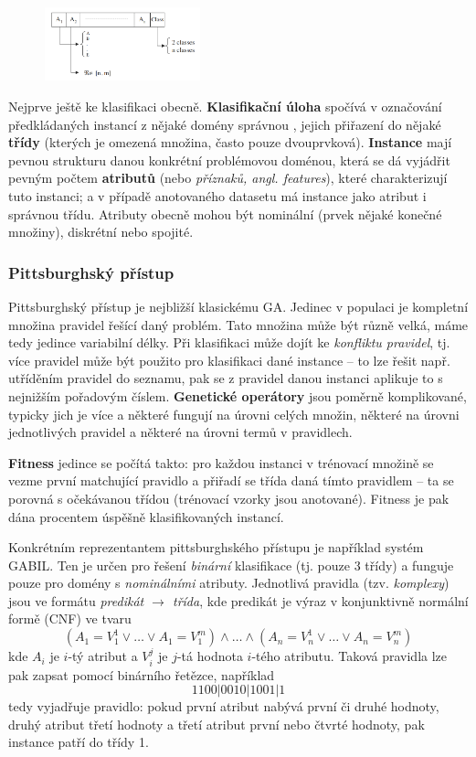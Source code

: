 \begin{figure}
\centering
\includegraphics[width=0.4\textwidth]{img/classification_instance.png}
\end{figure}
Nejprve ještě ke klasifikaci obecně. \textbf{Klasifikační úloha} spočívá v označování předkládaných instancí z nějaké domény správnou , jejich přiřazení do nějaké \textbf{třídy} (kterých je omezená množina, často pouze dvouprvková). \textbf{Instance} mají pevnou strukturu danou konkrétní problémovou doménou, která se dá vyjádřit pevným počtem \textbf{atributů} (nebo \textit{příznaků, angl. features}), které charakterizují tuto instanci; a v případě anotovaného datasetu má instance jako atribut i správnou třídu. Atributy obecně mohou být nominální (prvek nějaké konečné množiny), diskrétní nebo spojité.


\subsubsection{Pittsburghský přístup}
Pittsburghský přístup je nejbližší klasickému GA. Jedinec v populaci je kompletní množina pravidel řešící daný problém. Tato množina může být různě velká, máme tedy jedince variabilní délky. Při klasifikaci může dojít ke \textit{konfliktu pravidel}, tj. více pravidel může být použito pro klasifikaci dané instance -- to lze řešit např. utříděním pravidel do seznamu, pak se z pravidel  danou instanci aplikuje to s nejnižším pořadovým číslem. \textbf{Genetické operátory} jsou poměrně komplikované, typicky jich je více a některé fungují na úrovni celých množin, některé na úrovni jednotlivých pravidel a některé na úrovni termů v pravidlech. 

\textbf{Fitness} jedince se počítá takto: pro každou instanci v trénovací množině se vezme první matchující pravidlo a přiřadí se třída daná tímto pravidlem -- ta se porovná s očekávanou třídou (trénovací vzorky jsou anotované). Fitness je pak dána procentem úspěšně klasifikovaných instancí.

Konkrétním reprezentantem pittsburghského přístupu je například systém GABIL. Ten je určen pro řešení \textit{binární} klasifikace (tj. pouze 3 třídy) a funguje pouze pro domény s \textit{nominálními} atributy. Jednotlivá pravidla (tzv. \textit{komplexy}) jsou ve formátu \textit{predikát $\rightarrow$ třída}, kde predikát je výraz v konjunktivně normální formě (CNF) ve tvaru
$$(A_1 = V_1^1 \lor \dots \lor A_1 = V_1^m) \land \dots \land (A_n = V_n^1 \lor \dots \lor A_n = V_n^m)$$
kde $A_i$ je $i$-tý atribut a $V_i^j$ je $j$-tá hodnota $i$-tého atributu. Taková pravidla lze pak zapsat pomocí binárního řetězce, například 
$$1100|0010|1001|1$$
tedy vyjadřuje pravidlo: pokud první atribut nabývá první či druhé hodnoty, druhý atribut třetí hodnoty a třetí atribut první nebo čtvrté hodnoty, pak instance patří do třídy 1. 

